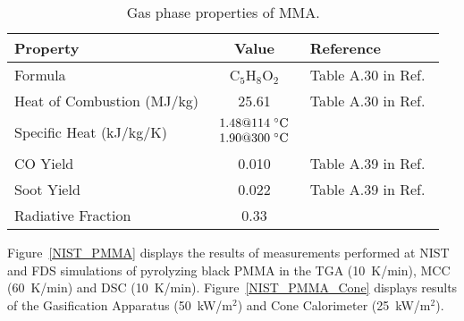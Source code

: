 
\begin{table}[!h]
\caption[Gas phase MMA properties]{Gas phase properties of MMA.}
\begin{center}
\begin{tabular}{|l|c|l|}
\hline
Property                                      & Value                                                                                                & Reference                         \\ \hline \hline
Formula                                       & C$_5$H$_8$O$_2$                                                                                      & Table A.30 in Ref.~\cite{SFPE}    \\ \hline
Heat of Combustion (MJ/kg)                    & 25.61                                                                                                & Table A.30 in Ref.~\cite{SFPE}    \\ \hline
Specific Heat (kJ/kg/K)                       & $\begin{array}{l} 1.48 @ 114 \; ^\circ \hbox{C} \\ 1.90 @ 300 \; ^\circ \hbox{C} \end{array}$        & \cite{chemeo}                     \\ \hline
CO Yield                                      & 0.010                                                                                                & Table A.39 in Ref.~\cite{SFPE}    \\ \hline
Soot Yield                                    & 0.022                                                                                                & Table A.39 in Ref.~\cite{SFPE}    \\ \hline
Radiative Fraction                            & 0.33                                                                                                 & \cite{Quintiere:FM2016}           \\ \hline
\end{tabular}
\end{center}
\label{MMA_Gas_Properties}
\end{table}


Figure~\ref{NIST_PMMA} displays the results of measurements performed at NIST and FDS simulations of pyrolyzing black PMMA in the TGA (10~K/min), MCC (60~K/min) and DSC (10~K/min). Figure~\ref{NIST_PMMA_Cone} displays results of the Gasification Apparatus (50~kW/m$^2$) and Cone Calorimeter (25~kW/m$^2$).

